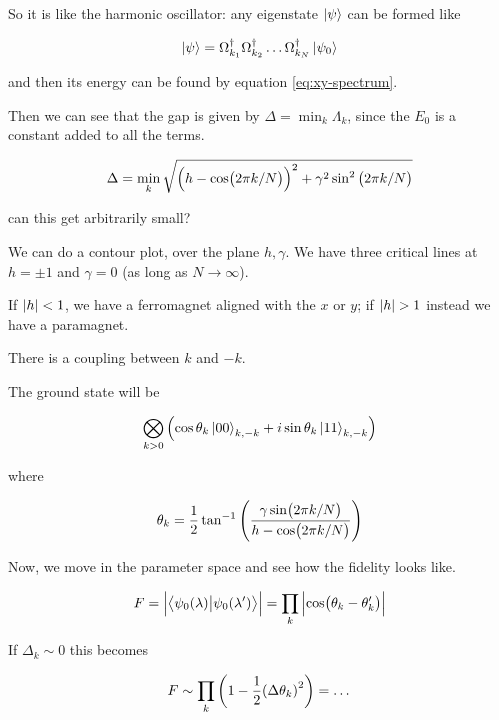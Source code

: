 \documentclass[main_zanardi.tex]{subfiles}
\begin{document}
So it is like the harmonic oscillator: any eigenstate \(\ket{\psi } \) can be formed like

\begin{equation}
    \ket{\psi} = \Omega_{k_1}^\dag \Omega_{k_2}^\dag \dots \Omega_{k_N}^\dag \ket{\psi_0}
\end{equation}

and then its energy can be found by equation \eqref{eq:xy-spectrum}.

Then we can see that the gap is given by \(\Delta = \min_k \Lambda_k\), since the \(E_0\) is a constant added to all the terms.

\begin{equation}
    \Delta = \min_k \sqrt{\qty(h - \cos(2 \pi k /N))^2 + \gamma^2 \sin^2\qty(2 \pi k /N) }
\end{equation}

can this get arbitrarily small?

We can do a contour plot, over the plane \(h, \gamma\). We have three critical lines at \(h = \pm 1\) and \(\gamma = 0\) (as long as \(N \rightarrow \infty\)).

If \(\abs{h} <1\), we have a ferromagnet aligned with the \(x\) or \(y\); if \(\abs{h}>1\) instead we have a paramagnet.

There is a coupling between \(k\) and \(-k\).

The ground state will be

\begin{equation}
    \bigotimes _{k>0}\qty( \cos \theta_k \ket{00}_{k, -k} + i \sin \theta_k \ket{11}_{k, -k} )
\end{equation}

where

\begin{equation}
    \theta_k = \frac{1}{2}\tan ^{-1} \qty(\frac{\gamma \sin (2 \pi k /N)}{h - \cos (2 \pi k /N)})
\end{equation}

Now, we move in the parameter space and see how the fidelity looks like.

\begin{equation}
    F = \abs{\braket{\psi_0 (\lambda)}{\psi_0 (\lambda')} } = \prod _k \abs{\cos(\theta_k - \theta_k ')}
\end{equation}

If \(\Delta_k \sim 0\) this becomes

\begin{equation}
    F \sim \prod_k \qty(1 - \frac{1}{2} \qty(\Delta \theta_k)^2) = \dots
\end{equation}
\end{document}
